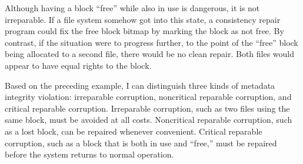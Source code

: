 Although having a block ``free'' while also in use is dangerous, it is
not irreparable.  If a file system somehow got into this state, a
consistency repair program could fix the free block
bitmap by marking the block as not free.  By contrast, if the
situation were to progress further, to the point of the ``free'' block
being allocated to a second file, there would be no clean repair.
Both files would appear to have equal rights to the block.

Based on the preceding example, I can distinguish three kinds of
metadata integrity violation: irreparable corruption, noncritical
reparable corruption, and critical reparable corruption.  Irreparable
corruption, such as two files using the same block, must be
avoided at all costs.  Noncritical reparable corruption, such as a
lost block, can be repaired whenever convenient.  Critical reparable
corruption, such as a block that is both in use and ``free,'' must be
repaired before the system returns to normal operation.

